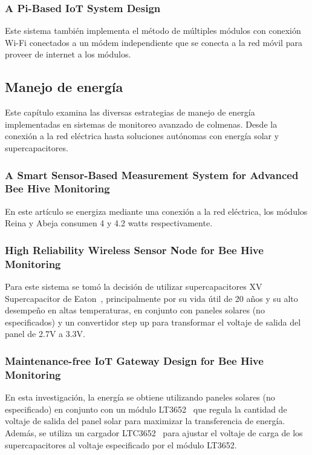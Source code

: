 \subsubsection{A Pi-Based IoT System Design}
Este sistema también implementa el método de múltiples módulos con conexión Wi-Fi conectados a un módem independiente que se conecta a la red móvil para proveer de internet a los módulos.~\cite{chen_chien_hsu_jing_lin_lin_2020}

\subsection{Manejo de energía}
Este capítulo examina las diversas estrategias de manejo de energía implementadas en sistemas de monitoreo avanzado de colmenas. Desde la conexión a la red eléctrica hasta soluciones autónomas con energía solar y supercapacitores.

\subsubsection{A Smart Sensor-Based Measurement System for Advanced Bee Hive Monitoring}
En este artículo se energiza mediante una conexión a la red eléctrica, los módulos Reina y Abeja consumen 4 y 4.2 watts respectivamente.~\cite{cecchi_spinsante_terenzi_orcioni_2020}

\subsubsection{High Reliability Wireless Sensor Node for Bee Hive Monitoring}
Para este sistema se tomó la decisión de utilizar supercapacitores XV Supercapacitor de Eaton~\cite{supercapacitor_xv_eaton}, principalmente por su vida útil de 20 años y su alto desempeño en altas temperaturas, en conjunto con paneles solares (no especificados) y un convertidor step up para transformar el voltaje de salida del panel de 2.7V a 3.3V.~\cite{vidrascu_svasta_vladescu_2016}

\subsubsection{Maintenance-free IoT Gateway Design for Bee Hive Monitoring}
En esta investigación, la energía se obtiene utilizando paneles solares (no especificado) en conjunto con un módulo LT3652~\cite{lt3652_datasheet} que regula la cantidad de voltaje de salida del panel solar para maximizar la transferencia de energía. Además, se utiliza un cargador LTC3652~\cite{ltc3652_datasheet} para ajustar el voltaje de carga de los supercapacitores al voltaje especificado por el módulo LT3652.~\cite{vidrascu_svasta_2017b}

